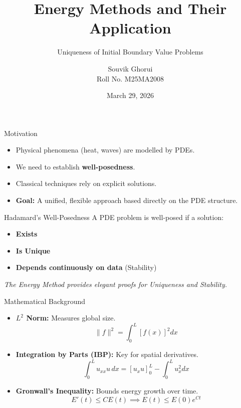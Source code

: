 \documentclass{beamer}
\title{Energy Methods and Their Application}
\subtitle{Uniqueness of Initial Boundary Value Problems}
\author{Souvik Ghorui \\ \small Roll No. M25MA2008}
\institute{Department of Mathematics \\ Course: MAL5030 (M.Sc. M.Tech)}
\date{March 29, 2026}
\begin{document}
\begin{frame}
    \titlepage
\end{frame}

\begin{frame}{Motivation}
    \begin{itemize}[<+->]
        \item Physical phenomena (heat, waves) are modelled by PDEs.
        \item We need to establish \textbf{well-posedness}.
        \item Classical techniques rely on explicit solutions.
        \item \textbf{Goal:} A unified, flexible approach based directly on the PDE structure.
    \end{itemize}
\end{frame}

\begin{frame}{Hadamard's Well-Posedness}
    A PDE problem is well-posed if a solution:
    \vspace{0.5cm}
    \begin{itemize}[<+->]
        \item \textbf{Exists}
        \item \textbf{Is Unique} 
        \item \textbf{Depends continuously on data} (Stability)
    \end{itemize}
    \vspace{0.5cm}
    \pause
    \textit{The Energy Method provides elegant proofs for Uniqueness and Stability.}
\end{frame}

\begin{frame}{Mathematical Background}
    \begin{itemize}[<+->]
        \item \textbf{$L^2$ Norm:} Measures global size.
        \[ \|f\|^2 = \int_0^L [f(x)]^2 dx \]
        
        \item \textbf{Integration by Parts (IBP):} Key for spatial derivatives.
        \[ \int_0^L u_{xx} u \, dx = [u_x u]_0^L - \int_0^L u_x^2 dx \]
        
        \item \textbf{Gronwall's Inequality:} Bounds energy growth over time.
        \[ E'(t) \le C E(t) \implies E(t) \le E(0)e^{Ct} \]
    \end{itemize}
\end{frame}
\end{document}
